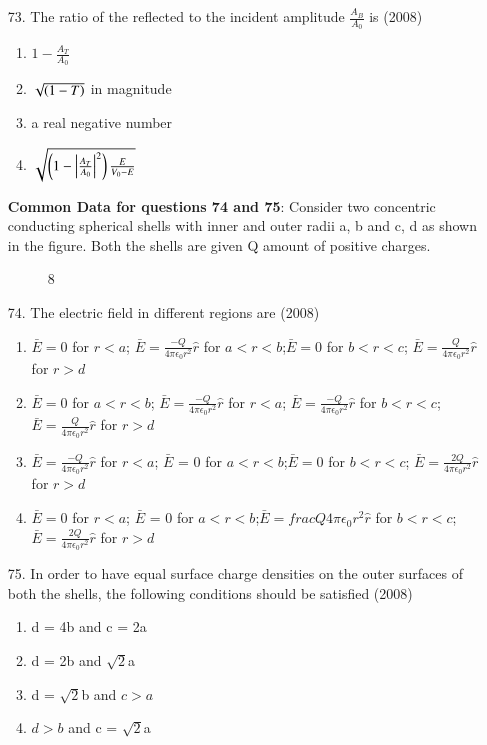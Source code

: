 \documentclass[journal]{IEEEtran}
\begin{document}
\begin{enumerate}
\begin{enumerate}[label=(\Alph*)]
      \end{enumerate}
    \item[73.] The ratio of the reflected to the incident amplitude $\frac{A_B}{A_0}$ is \hfill (2008)
      \begin{enumerate}[label = (\Alph*)]
        \item $1-\frac{A_T}{A_0}$
        \item $\sqrt{\left(1-T\right)}$ in magnitude
        \item a real negative number
        \item $\sqrt{\left(1-\left\vert\frac{A_T}{A_0}\right\vert^2\right)\frac{E}{V_0 - E}}$
      \end{enumerate}
    \textbf{Common Data for questions 74 and 75}: Consider two concentric conducting spherical shells with inner and outer radii a, b and c, d as shown in the figure. Both the shells are given Q amount of positive charges.
    \begin{figure}[!ht]
      \centering
      \caption{ 8}
      \label{fig 8}
  \end{figure}
    \item[74.] The electric field in different regions are \hfill (2008)
      \begin{enumerate}[label=(\Alph*)]
        \item $\bar{E} = 0$ for $r < a$; $\bar{E} = \frac{-Q}{4\pi\epsilon_0r^2}\hat{r}$ for $a<r<b$;$\bar{E} = 0$ for $b< r < c$; $\bar{E} = \frac{Q}{4\pi\epsilon_0r^2}\hat{r}$ for $r>d$
        \item $\bar{E} = 0$ for $a < r < b$; $\bar{E} = \frac{-Q}{4\pi\epsilon_0r^2}\hat{r}$ for $r<a$; $\bar{E} = \frac{-Q}{4\pi\epsilon_0r^2}\hat{r}$ for $b< r < c$; $\bar{E} = \frac{Q}{4\pi\epsilon_0r^2}\hat{r}$ for $r>d$ 
        \item $\bar{E} = \frac{-Q}{4\pi\epsilon_0r^2}\hat{r}$ for $r < a$; $\bar{E}$ = 0 for $a<r<b$;$\bar{E} = 0$ for $b< r < c$; $\bar{E} = \frac{2Q}{4\pi\epsilon_0r^2}\hat{r}$ for $r>d$ 
        \item $\bar{E} = 0$ for $r < a$; $\bar{E}$ = 0 for $a<r<b$;$\bar{E} = frac{Q}{4\pi\epsilon_0r^2}\hat{r}$ for $b< r < c$; $\bar{E} = \frac{2Q}{4\pi\epsilon_0r^2}\hat{r}$ for $r>d $ 
      \end{enumerate}
    \item[75.] In order to have equal surface charge densities on the outer surfaces of both the shells, the following conditions should be satisfied \hfill (2008)
     \begin{enumerate}[label=(\Alph*)]
        \item d = 4b and c = 2a
        \item d = 2b and $\sqrt{2}$a
        \item d = $\sqrt{2}$b and $c>a$
        \item $d>b$ and c = $\sqrt{2}$a 
     \end{enumerate}

\end{enumerate}
\end{document}
